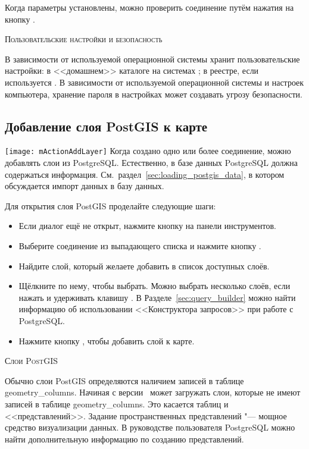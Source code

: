 Когда параметры установлены, можно проверить соединение путём нажатия
на кнопку  .

\begin{Tip}\caption{\textsc{\qg Пользовательские настройки и безопасность}}
В зависимости от используемой операционной системы \qg хранит
пользовательские настройки: в <<домашнем>> каталоге на \nix системах
; в реестре, если используется \win. В зависимости
от используемой операционной системы и настроек компьютера, хранение пароля
в настройках \qg может создавать угрозу безопасности.
\end{Tip}

\subsection{Добавление слоя PostGIS к карте}

\texttt{[image: mActionAddLayer]} Когда создано одно или
более соединение, можно добавлять слои из PostgreSQL. Естественно, в базе
данных PostgreSQL должна содержаться
информация. См.~раздел~\ref{sec:loading_postgis_data}, в котором
обсуждается импорт данных в базу данных.

Для открытия слоя PostGIS проделайте следующие шаги:

\begin{itemize}[label=--]
\item Если диалог  ещё не открыт, нажмите
кнопку  на панели
инструментов.
\item Выберите соединение из выпадающего списка и нажмите кнопку
.
\item Найдите слой, который желаете добавить в список доступных слоёв.
\item Щёлкните по нему, чтобы выбрать. Можно выбрать несколько слоёв,
если нажать и удерживать клавишу . В
Разделе~\ref{sec:query_builder} можно найти информацию об использовании
<<Конструктора запросов>> при работе с PostgreSQL.
\item Нажмите кнопку , чтобы добавить слой к карте.
\end{itemize}

\begin{Tip}\caption{\textsc{Слои PostGIS}}
Обычно слои PostGIS определяются наличием записей в таблице
geometry\_columns. Начиная с версии \OLD\, %
\qg может загружать слои, которые не имеют записей в таблице
geometry\_columns. Это касается таблиц и <<представлений>>.
Задание пространственных представлений "--- мощное средство визуализации данных.
В руководстве пользователя PostgreSQL можно найти дополнительную информацию
по созданию представлений.
\end{Tip}

